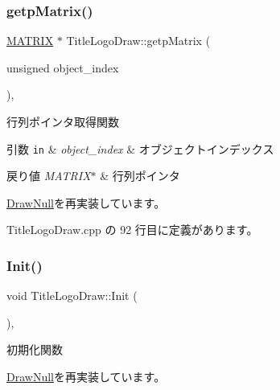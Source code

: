 \subsubsection{\texorpdfstring{getp\+Matrix()}{getpMatrix()}}
{\footnotesize\ttfamily \mbox{\hyperlink{_vector3_d_8h_a032295cd9fb1b711757c90667278e744}{M\+A\+T\+R\+IX}} $\ast$ Title\+Logo\+Draw\+::getp\+Matrix (\begin{DoxyParamCaption}\item[{unsigned}]{object\+\_\+index }\end{DoxyParamCaption})\hspace{0.3cm}{\ttfamily [override]}, {\ttfamily [virtual]}}



行列ポインタ取得関数 


\begin{DoxyParams}[1]{引数}
\mbox{\tt in}  & {\em object\+\_\+index} & オブジェクトインデックス \\
\hline
\end{DoxyParams}

\begin{DoxyRetVals}{戻り値}
{\em M\+A\+T\+R\+I\+X$\ast$} & 行列ポインタ \\
\hline
\end{DoxyRetVals}


\mbox{\hyperlink{class_draw_null_a9aac059eb3b5d1f77e8bd3aa0647cff9}{Draw\+Null}}を再実装しています。



 Title\+Logo\+Draw.\+cpp の 92 行目に定義があります。

\mbox{\label{class_title_logo_draw_a9f70fb70639510908f4e07ee14667e30}} 
\subsubsection{\texorpdfstring{Init()}{Init()}}
{\footnotesize\ttfamily void Title\+Logo\+Draw\+::\+Init (\begin{DoxyParamCaption}{ }\end{DoxyParamCaption})\hspace{0.3cm}{\ttfamily [override]}, {\ttfamily [virtual]}}



初期化関数 



\mbox{\hyperlink{class_draw_null_a20aef1e54c1a158b741bfd731e18efdf}{Draw\+Null}}を再実装しています。



